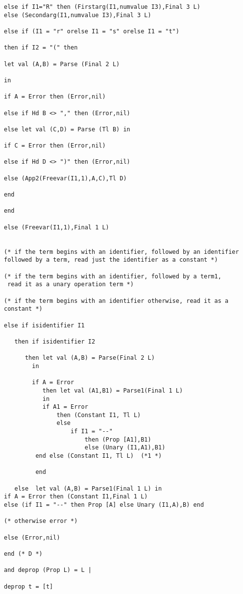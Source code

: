 \documentclass{article}
\begin{document}
{{\begin{verbatim}
else if I1="R" then (Firstarg(I1,numvalue I3),Final 3 L)
else (Secondarg(I1,numvalue I3),Final 3 L)

else if (I1 = "r" orelse I1 = "s" orelse I1 = "t")

then if I2 = "(" then

let val (A,B) = Parse (Final 2 L)

in

if A = Error then (Error,nil)

else if Hd B <> "," then (Error,nil)

else let val (C,D) = Parse (Tl B) in

if C = Error then (Error,nil)

else if Hd D <> ")" then (Error,nil)

else (App2(Freevar(I1,1),A,C),Tl D)

end

end

else (Freevar(I1,1),Final 1 L)


(* if the term begins with an identifier, followed by an identifier 
followed by a term, read just the identifier as a constant *)

(* if the term begins with an identifier, followed by a term1,
 read it as a unary operation term *)

(* if the term begins with an identifier otherwise, read it as a constant *)

else if isidentifier I1

   then if isidentifier I2

      then let val (A,B) = Parse(Final 2 L) 
        in

        if A = Error 
           then let val (A1,B1) = Parse1(Final 1 L) 
           in
           if A1 = Error 
               then (Constant I1, Tl L) 
               else 
                   if I1 = "--" 
                       then (Prop [A1],B1) 
                       else (Unary (I1,A1),B1)
         end else (Constant I1, Tl L)  (*1 *)

         end

   else  let val (A,B) = Parse1(Final 1 L) in
if A = Error then (Constant I1,Final 1 L)
else (if I1 = "--" then Prop [A] else Unary (I1,A),B) end

(* otherwise error *)

else (Error,nil)

end (* D *)

and deprop (Prop L) = L |

deprop t = [t]


\end{verbatim}}}
\end{document}
